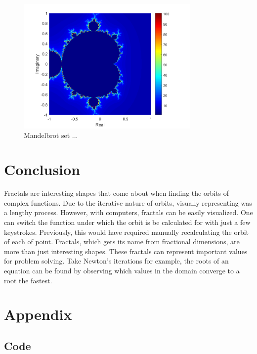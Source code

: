 \documentclass[letterpaper,11pt]{article}
\begin{document}
\begin{figure}
	\centering
	\includegraphics[width=3.5in]{../Figures/Mandelbrot.png}
	\caption{Mandelbrot set ...}
	\label{fig:Mandelbrot}
\end{figure}

\section{Conclusion}
Fractals are interesting shapes that come about when finding the orbits of complex functions. Due to the iterative nature of orbits, visually representing was a lengthy process. However, with computers, fractals can be easily visualized. One can switch the function under which the orbit is be calculated for with just a few keystrokes. Previously, this would have required manually recalculating the orbit of each of point. Fractals, which gets its name from fractional dimensions, are more than just interesting shapes. These fractals can represent important values for problem solving. Take Newton's iterations for example, the roots of an equation can be found by observing which values in the domain converge to a root the fastest. 

\section{Appendix}

\subsection{Code}

\end{document}
